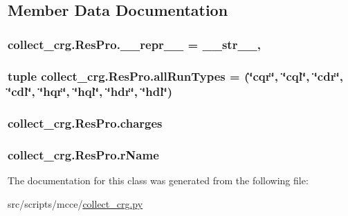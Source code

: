 \subsection{Member Data Documentation}
\hypertarget{classcollect__crg_1_1_res_pro_ab775338960aae2ea56892e7a39a6e63c}{
\subsubsection[{\-\_\-\-\_\-repr\-\_\-\-\_\-}]{\setlength{\rightskip}{0pt plus 5cm}collect\-\_\-crg.\-Res\-Pro.\-\_\-\-\_\-repr\-\_\-\-\_\- = {\bf \-\_\-\-\_\-str\-\_\-\-\_\-}\hspace{0.3cm}{\ttfamily [static]}, {\ttfamily [private]}}}\label{classcollect__crg_1_1_res_pro_ab775338960aae2ea56892e7a39a6e63c}
\hypertarget{classcollect__crg_1_1_res_pro_a0978c5440914518afa5bba719a40bfa1}{
\subsubsection[{all\-Run\-Types}]{\setlength{\rightskip}{0pt plus 5cm}tuple collect\-\_\-crg.\-Res\-Pro.\-all\-Run\-Types = (\char`\"{}cqr\char`\"{}, \char`\"{}cql\char`\"{}, \char`\"{}cdr\char`\"{}, \char`\"{}cdl\char`\"{}, \char`\"{}hqr\char`\"{}, \char`\"{}hql\char`\"{}, \char`\"{}hdr\char`\"{}, \char`\"{}hdl\char`\"{})\hspace{0.3cm}{\ttfamily [static]}}}\label{classcollect__crg_1_1_res_pro_a0978c5440914518afa5bba719a40bfa1}
\hypertarget{classcollect__crg_1_1_res_pro_a7075290e45b0608bb59ebfe42722b4e3}{
\subsubsection[{charges}]{\setlength{\rightskip}{0pt plus 5cm}collect\-\_\-crg.\-Res\-Pro.\-charges}}\label{classcollect__crg_1_1_res_pro_a7075290e45b0608bb59ebfe42722b4e3}
\hypertarget{classcollect__crg_1_1_res_pro_aec2b2fecfffa4aa7728013ee504d48f7}{
\subsubsection[{r\-Name}]{\setlength{\rightskip}{0pt plus 5cm}collect\-\_\-crg.\-Res\-Pro.\-r\-Name}}\label{classcollect__crg_1_1_res_pro_aec2b2fecfffa4aa7728013ee504d48f7}


The documentation for this class was generated from the following file\-:\begin{DoxyCompactItemize}
\item 
src/scripts/mcce/\hyperlink{collect__crg_8py}{collect\-\_\-crg.\-py}\end{DoxyCompactItemize}
